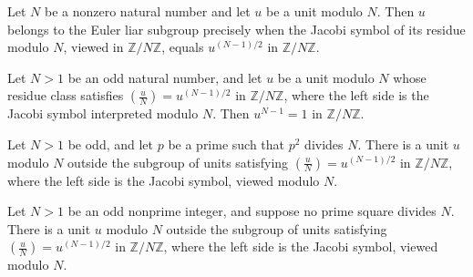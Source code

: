 \begin{theorem}
\label{Randomized.mem_eulerLiarSubgroup}
\leanok
{}
Let $N$ be a nonzero natural number and let $u$ be a unit modulo $N$. Then $u$ belongs
to the Euler liar subgroup precisely when the Jacobi symbol of its residue modulo $N$,
viewed in $\mathbb{Z}/N\mathbb{Z}$, equals $u^{(N-1)/2}$ in $\mathbb{Z}/N\mathbb{Z}$.
\end{theorem}

\begin{theorem}
\label{Randomized.pow_sub_one_eq_one_of_mem_eulerLiarSubgroup}
\leanok
{}
Let $N>1$ be an odd natural number, and let $u$ be a unit modulo $N$ whose residue class
satisfies $\left(\frac{u}{N}\right)=u^{(N-1)/2}$ in $\mathbb{Z}/N\mathbb{Z}$, where the
left side is the Jacobi symbol interpreted modulo $N$. Then $u^{N-1}=1$ in
$\mathbb{Z}/N\mathbb{Z}$.
\end{theorem}

\begin{theorem}
\label{Randomized.exists_not_mem_of_sq_dvd}
\leanok
{}
Let $N>1$ be odd, and let $p$ be a prime such that $p^2$ divides $N$. There is a unit
$u$ modulo $N$ outside the subgroup of units satisfying
$\left(\frac{u}{N}\right)=u^{(N-1)/2}$ in $\mathbb{Z}/N\mathbb{Z}$, where the left side
is the Jacobi symbol, viewed modulo $N$.
\end{theorem}

\begin{theorem}
\label{Randomized.exists_not_mem_of_not_sq_dvd}
\leanok
{}
Let $N>1$ be an odd nonprime integer, and suppose no prime square divides $N$. There is
a unit $u$ modulo $N$ outside the subgroup of units satisfying
$\left(\frac{u}{N}\right)=u^{(N-1)/2}$ in $\mathbb{Z}/N\mathbb{Z}$, where the left side
is the Jacobi symbol, viewed modulo $N$.
\end{theorem}

